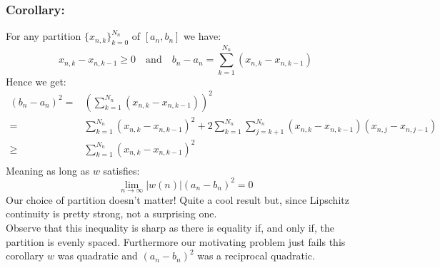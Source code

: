 \subsubsection{Corollary:}
For any partition $\{x_{n,k}\}_{k=0}^{N_n}$ of $[a_n,b_n]$ we have:
\[x_{n,k}-x_{n,k-1}\geq 0 \quad\text{and}\quad b_n-a_n =\sum_{k=1}^{N_n}(x_{n,k}-x_{n,k-1})\]
Hence we get:
\[\begin{aligned}
(b_n-a_n)^2 =& \left(\sum_{k=1}^{N_n}(x_{n,k}-x_{n,k-1})\right)^2\\
=& \sum_{k=1}^{N_n}(x_{n,k}-x_{n,k-1})^2 + 2\sum_{k=1}^{N_n}\sum_{j=k+1}^{N_n}(x_{n,k}-x_{n,k-1})(x_{n,j}-x_{n,j-1})\\
\geq& \sum_{k=1}^{N_n}(x_{n,k}-x_{n,k-1})^2 \\
\end{aligned}\]
Meaning as long as $w$ satisfies:
\[\lim_{n\rightarrow\infty}|w(n)|(a_{n}-b_{n})^2 = 0\]
Our choice of partition doesn't matter!
Quite a cool result but,
since Lipschitz continuity is pretty strong,
not a surprising one.
\\

Observe that this inequality is sharp as there is equality if,
and only if,
the partition is evenly spaced.
Furthermore our motivating problem just fails this corollary $w$ was quadratic and $(a_n-b_n)^2$ was a reciprocal quadratic.
